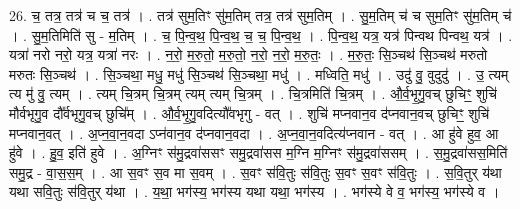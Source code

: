 \documentclass[17pt]{extarticle}
\begin{document}
26. च॒ तत्र॒ तत्र॑ च च॒ तत्र॑ । . तत्र॑ सुम॒तिꣳ सु॑म॒तिम् तत्र॒ तत्र॑ सुम॒तिम् । . सु॒म॒तिम् च॑ च सुम॒तिꣳ सु॑म॒तिम् च॑ । . सु॒म॒तिमिति॑ सु - म॒तिम् । . च॒ पि॒न्व॒थ॒ पि॒न्व॒थ॒ च॒ च॒ पि॒न्व॒थ॒ । . पि॒न्व॒थ॒ यत्र॒ यत्र॑ पिन्वथ पिन्वथ॒ यत्र॑ । . यत्रा॑ नरो नरो॒ यत्र॒ यत्रा॑ नरः । . न॒रो॒ म॒रु॒तो॒ म॒रु॒तो॒ न॒रो॒ न॒रो॒ म॒रु॒तः॒ । . म॒रु॒तः॒ सि॒ञ्चथ॑ सि॒ञ्चथ॑ मरुतो मरुतः सि॒ञ्चथ॑ । . सि॒ञ्चथा॒ मधु॒ मधु॑ सि॒ञ्चथ॑ सि॒ञ्चथा॒ मधु॑ । . मध्विति॒ मधु॑ । . उदु॑ वु॒ वुदुदु॑ । . उ॒ त्यम् त्य मु॑ वु॒ त्यम् । . त्यम् चि॒त्रम् चि॒त्रम् त्यम् त्यम् चि॒त्रम् । . चि॒त्रमिति॑ चि॒त्रम् । . औ॒र्व॒भृ॒गु॒वच् छुचिꣳ॒॒ शुचि॑ मौर्वभृगु॒व दौ᳚र्वभृगु॒वच् छुचि᳚म् । . औ॒र्व॒भृ॒गु॒वदित्यौ᳚वभृगु - वत् । . शुचि॑ मप्नवान॒व द॑प्नवान॒वच् छुचिꣳ॒॒ शुचि॑ मप्नवान॒वत् । . अ॒प्न॒वा॒न॒वदा ऽप्न॑वान॒व द॑प्नवान॒वदा । . अ॒प्न॒वा॒न॒वदित्य॑प्नवान - वत् । . आ हु॑वे हुव॒ आ हु॑वे । . हु॒व॒ इति॑ हुवे । . अ॒ग्निꣳ स॑मु॒द्रवा॑ससꣳ समु॒द्रवा॑सस म॒ग्नि म॒ग्निꣳ स॑मु॒द्रवा॑ससम् । . स॒मु॒द्रवा॑सस॒मिति॑ समु॒द्र - वा॒स॒स॒म् । . आ स॒वꣳ स॒व मा स॒वम् । . स॒वꣳ स॑वि॒तुः स॑वि॒तुः स॒वꣳ स॒वꣳ स॑वि॒तुः । . स॒वि॒तुर् य॑था यथा सवि॒तुः स॑वि॒तुर् य॑था । . य॒था॒ भग॑स्य॒ भग॑स्य यथा यथा॒ भग॑स्य । . भग॑स्ये वे व॒ भग॑स्य॒ भग॑स्ये व । \newline
\end{document}
